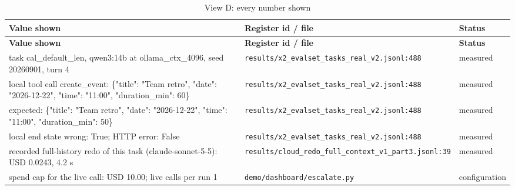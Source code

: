 \begin{longtable}{>{\raggedright\arraybackslash}p{}>{\raggedright\arraybackslash}p{}>{\raggedright\arraybackslash}p{}}
\caption{View D: every number shown}\label{tab:d}\\
\toprule
\textbf{Value shown} & \textbf{Register id / file} & \textbf{Status} \\
\midrule
\endfirsthead
\toprule
\textbf{Value shown} & \textbf{Register id / file} & \textbf{Status} \\
\midrule
\endhead
\small task cal\_default\_len, qwen3:14b at ollama\_ctx\_4096, seed 20260901, turn 4 & {\footnotesize \texttt{results/\allowbreak{}x2\_\allowbreak{}evalset\_\allowbreak{}tasks\_\allowbreak{}real\_\allowbreak{}v2.\allowbreak{}jsonl:\allowbreak{}488}} & \small measured \\

\small local tool call create\_event: \{"title": "Team retro", "date": "2026-12-22", "time": "11:00", "duration\_min": 60\} & {\footnotesize \texttt{results/\allowbreak{}x2\_\allowbreak{}evalset\_\allowbreak{}tasks\_\allowbreak{}real\_\allowbreak{}v2.\allowbreak{}jsonl:\allowbreak{}488}} & \small measured \\

\small expected: \{"title": "Team retro", "date": "2026-12-22", "time": "11:00", "duration\_min": 50\} & {\footnotesize \texttt{results/\allowbreak{}x2\_\allowbreak{}evalset\_\allowbreak{}tasks\_\allowbreak{}real\_\allowbreak{}v2.\allowbreak{}jsonl:\allowbreak{}488}} & \small measured \\

\small local end state wrong: True; HTTP error: False & {\footnotesize \texttt{results/\allowbreak{}x2\_\allowbreak{}evalset\_\allowbreak{}tasks\_\allowbreak{}real\_\allowbreak{}v2.\allowbreak{}jsonl:\allowbreak{}488}} & \small measured \\

\small recorded full-history redo of this task (claude-sonnet-5-5): USD 0.0243, 4.2 s & {\footnotesize \texttt{results/\allowbreak{}cloud\_\allowbreak{}redo\_\allowbreak{}full\_\allowbreak{}context\_\allowbreak{}v1\_\allowbreak{}part3.\allowbreak{}jsonl:\allowbreak{}39}} & \small measured \\

\small spend cap for the live call: USD 10.00; live calls per run 1 & {\footnotesize \texttt{demo/\allowbreak{}dashboard/\allowbreak{}escalate.\allowbreak{}py}} & \small configuration \\

\bottomrule
\end{longtable}
